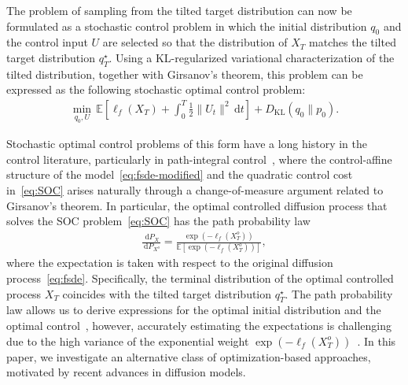 \documentclass[letterpaper, 10 pt, conference]{ieeeconf}  %
\def\Expect{{\mathbb E}}
\newcommand{\ud}{\,\mathrm{d}}
\newcommand{\Xo}{X^o}
\begin{document}
The problem of sampling from the tilted target distribution can now be formulated as a stochastic control problem in which the initial distribution $q_0$ and the control input $U$ are selected so that the distribution of $X_T$ matches the tilted target distribution $q^\star_T$. Using a KL-regularized variational characterization of the tilted distribution, together with Girsanov’s theorem, this problem can be expressed as the following stochastic optimal control problem:
\begin{align}\label{eq:SOC}
    \min_{q_0,U}\, \Expect\left[\ell_f(X_T) + \int_0^T \frac{1}{2} \|U_t\|^2 \ud t \right] + D_\mathrm{KL}(q_0\|p_0).
\end{align}

Stochastic optimal control problems of this form have a long history in the control literature, particularly in path-integral control~\cite{kappen2005linear,todorov2006linearly,theodorou2010generalized}, where the control-affine structure of the model~\eqref{eq:fsde-modified} and the quadratic control cost in~\eqref{eq:SOC} arises naturally through a change-of-measure argument related to Girsanov’s theorem. 
In particular, the optimal 
controlled diffusion process that solves the SOC problem~\eqref{eq:SOC} has the path probability law
\begin{align*}
    \frac{\ud P_{X}}{\ud P_{\Xo}} = \frac{\exp\left(- \ell_f(\Xo_T)\right)}{\Expect[\exp\left(- \ell_f(\Xo_T)\right)]},
\end{align*}
where the expectation is taken with respect to the original diffusion process~\eqref{eq:fsde}. Specifically, the terminal distribution of the optimal controlled process $X_T$ coincides with the tilted target distribution $q^\star_T$. The  path probability law allows us to derive expressions for the optimal initial distribution and the optimal control~\cite[Thm. 1]{uehara2024fine}, however, accurately estimating the expectations is challenging due to the high variance of the exponential weight $\exp(-\ell_f(\Xo_T))$~\cite{williams2017model, exarchos2018stochastic}. 
In this paper, we investigate an alternative class of optimization-based approaches, motivated by recent advances in diffusion models. 
\end{document}
